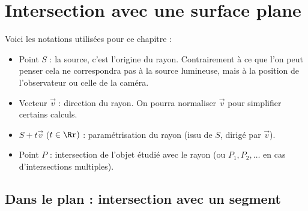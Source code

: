 \documentclass[11pt,class=report,crop=false]{standalone}
\begin{document}










\section{Intersection avec une surface plane}

Voici les notations utilisées pour ce chapitre :
\begin{itemize}
  \item Point $S$ : la source, c'est l'origine du rayon. Contrairement à ce que l'on peut penser cela ne correspondra pas à la source lumineuse, mais à la position de l'observateur ou celle de la caméra.
  \item Vecteur $\vec v$ : direction du rayon. On pourra normaliser $\vec v$ pour simplifier certains calculs.
  \item $S + t \vec v$ ($t\in\Rr)$ : paramétrisation du rayon (issu de $S$, dirigé par $\vec v$).
  \item Point $P$ : intersection de l'objet étudié avec le rayon (ou $P_1, P_2,\ldots$ en cas d'intersections multiples).
\end{itemize}

\subsection{Dans le plan : intersection avec un segment}
\end{document}
